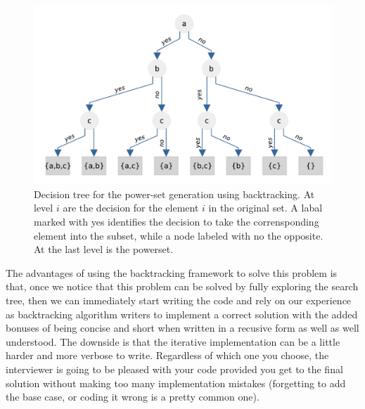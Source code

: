 \begin{figure}
	\centering
	\includegraphics[width=\textwidth]{sources/power_set/images/tree}
	\caption[Decision tree for the power-set generation using backtracking.]{Decision tree for the power-set generation using backtracking. At level $i$ are the decision for the element $i$ in the original set. A labal marked with yes identifies the decision to take the corrensponding element into the subset, while a node labeled with no the opposite. At the last level is the powerset.}
	\label{ref:power_set_decision_trees}
\end{figure}

The advantages of using the backtracking framework to solve this problem is that, once we notice
that this problem can be solved by fully exploring the search tree, then we can immediately
start writing the code and rely on our experience as backtracking algorithm writers to implement a correct
solution with the added bonuses of being concise and short when written in a recusive form  as well
as well understood.
The downside is that the iterative implementation can be a little harder and more verbose to write.
Regardless of which one you choose, the interviewer is going to be pleased with your code provided you get to the final solution
without making too many implementation mistakes (forgetting to add the base case, or coding it wrong
is a pretty common one).

